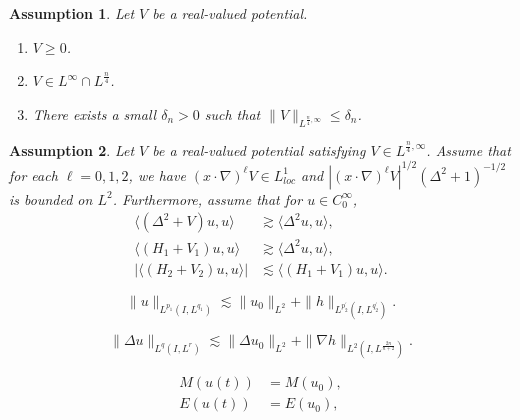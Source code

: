 \documentclass[10pt,a4paper]{amsart}
\newtheorem{assumption}{Assumption}
\begin{document}
\begin{assumption}\label{as:equ}
Let $V$ be a real-valued potential.
\begin{enumerate}
\item $V \geq 0$.
\item $V \in L^{\infty} \cap L^{\frac{n}{4}}$.
\item There exists a small $\delta_{n} > 0$ such that $\|V\|_{L^{\frac{n}{4},\infty}} \leq \delta_{n}$.
\end{enumerate}
\end{assumption}

\begin{assumption}\label{as:strichartz}
Let $V$ be a real-valued potential satisfying $V \in L^{\frac{n}{4}, \infty}$. Assume that for each $\ell = 0, 1, 2$, we have $(x\cdot \nabla)^{\ell}V \in L^{1}_{loc}$ and $|(x\cdot \nabla)^{\ell}V|^{1/2}(\Delta^{2} + 1)^{-1/2}$ is bounded on $L^{2}$. Furthermore, assume that for $u \in C_{0}^{\infty}$,
\begin{align}
  \langle (\Delta^{2} + V)u, u \rangle &\gtrsim \langle \Delta^{2}u, u \rangle, \\
  \langle (H_{1} + V_{1})u, u \rangle &\gtrsim \langle \Delta^{2}u, u \rangle, \\
  |\langle (H_{2} + V_{2})u, u \rangle| &\lesssim \langle (H_{1} + V_{1})u, u \rangle.
\end{align}
\end{assumption}

\begin{equation}\label{standard}
\|u\|_{L^{p_{1}}(I, L^{q_{1}})} \lesssim \|u_{0}\|_{L^{2}} + \|h\|_{L^{p_{2}^{\prime}}(I, L^{q_{2}^{\prime}})}.
\end{equation}

\begin{equation}\label{strichartz}
\|\Delta u\|_{L^{q}(I, L^{r})} \lesssim \|\Delta u_{0}\|_{L^{2}} + \|\nabla h\|_{L^{2}(I, L^{\frac{2n}{n + 2}})}.
\end{equation}

\begin{equation}\label{mass energy con}
\begin{aligned}
M(u(t)) &= M(u_{0}), \\
E(u(t)) &= E(u_{0}),
\end{aligned}
\end{equation}
\end{document}
